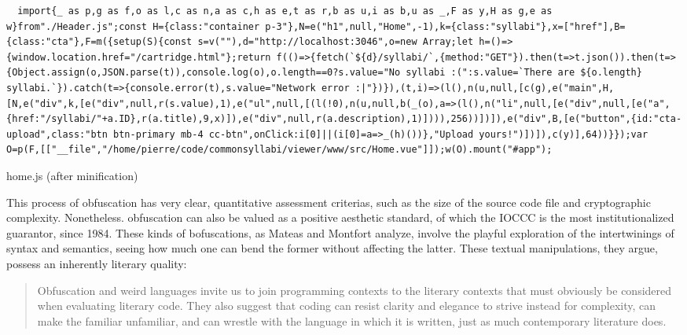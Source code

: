 \begin{listing}
  \begin{verbatim}
  import{_ as p,g as f,o as l,c as n,a as c,h as e,t as r,b as u,i as b,u as _,F as y,H as g,e as w}from"./Header.js";const H={class:"container p-3"},N=e("h1",null,"Home",-1),k={class:"syllabi"},x=["href"],B={class:"cta"},F=m({setup(S){const s=v(""),d="http://localhost:3046",o=new Array;let h=()=>{window.location.href="/cartridge.html"};return f(()=>{fetch(`${d}/syllabi/`,{method:"GET"}).then(t=>t.json()).then(t=>{Object.assign(o,JSON.parse(t)),console.log(o),o.length==0?s.value="No syllabi :(":s.value=`There are ${o.length} syllabi.`}).catch(t=>{console.error(t),s.value="Network error :|"})}),(t,i)=>(l(),n(u,null,[c(g),e("main",H,[N,e("div",k,[e("div",null,r(s.value),1),e("ul",null,[(l(!0),n(u,null,b(_(o),a=>(l(),n("li",null,[e("div",null,[e("a",{href:"/syllabi/"+a.ID},r(a.title),9,x)]),e("div",null,r(a.description),1)]))),256))])]),e("div",B,[e("button",{id:"cta-upload",class:"btn btn-primary mb-4 cc-btn",onClick:i[0]||(i[0]=a=>_(h)())},"Upload yours!")])]),c(y)],64))}});var O=p(F,[["__file","/home/pierre/code/commonsyllabi/viewer/www/src/Home.vue"]]);w(O).mount("#app");
\end{verbatim}
  \caption{home.js (after minification)}
  \label{code:home_minified_js}
\end{listing}

This process of obfuscation has very clear, quantitative assessment criterias, such as the size of the source code file and cryptographic complexity\cite{pellet-mary_co6gc_2020}. Nonetheless. obfuscation can also be valued as a positive aesthetic standard, of which the IOCCC is the most institutionalized guarantor, since 1984. These kinds of bofuscations, as Mateas and Montfort analyze, involve the playful exploration of the intertwinings of syntax and semantics, seeing how much one can bend the former without affecting the latter. These textual manipulations, they argue, possess an inherently literary quality:

\begin{quote}
  Obfuscation and weird languages invite us to join programming contexts to the literary contexts that must obviously be considered when evaluating literary code. They also suggest that coding can resist clarity and elegance to strive instead for complexity, can make the familiar unfamiliar, and can wrestle with the language in which it is written, just as much contemporary literature does.\cite{mateas_box_2005}
\end{quote}


